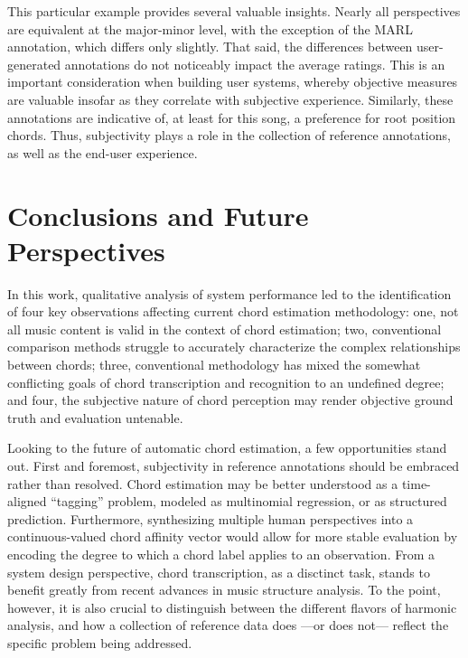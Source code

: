 \documentclass{article}
\begin{document}
This particular example provides several valuable insights.
Nearly all perspectives are equivalent at the major-minor level, with the exception of the MARL annotation, which differs only slightly.
That said, the differences between user-generated annotations do not noticeably impact the average ratings.
This is an important consideration when building user systems, whereby objective measures are valuable insofar as they correlate with subjective experience.
Similarly, these annotations are indicative of, at least for this song, a preference for root position chords.
Thus, subjectivity plays a role in the collection of reference annotations, as well as the end-user experience.


\section{Conclusions and Future Perspectives}
\label{sec:perspectives}

In this work, qualitative analysis of system performance led to the identification of four key observations affecting current chord estimation methodology:
one, not all music content is valid in the context of chord estimation;
two, conventional comparison methods struggle to accurately characterize the complex relationships between chords;
three, conventional methodology has mixed the somewhat conflicting goals of chord transcription and recognition to an undefined degree;
and four, the subjective nature of chord perception may render objective ground truth and evaluation untenable.

Looking to the future of automatic chord estimation, a few opportunities stand out.
First and foremost, subjectivity in reference annotations should be embraced rather than resolved.
Chord estimation may be better understood as a time-aligned ``tagging'' problem, modeled as multinomial regression, or as structured prediction.
Furthermore, synthesizing multiple human perspectives into a continuous-valued chord affinity vector would allow for more stable evaluation by encoding the degree to which a chord label applies to an observation.
From a system design perspective, chord transcription, as a disctinct task, stands to benefit greatly from recent advances in music structure analysis.
To the point, however, it is also crucial to distinguish between the different flavors of harmonic analysis, and how a collection of reference data does ---or does not--- reflect the specific problem being addressed.
\end{document}
